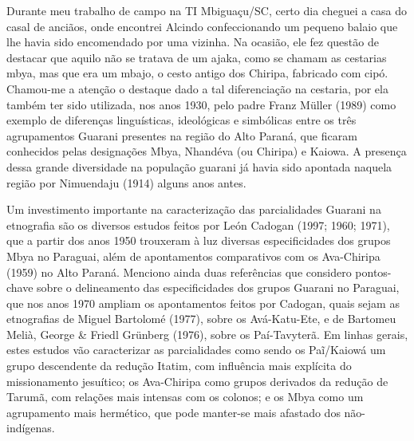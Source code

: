  


Durante meu trabalho de campo na TI Mbiguaçu/SC, certo dia cheguei a
casa do casal de anciãos, onde encontrei Alcindo confeccionando um
pequeno balaio que lhe havia sido encomendado por uma vizinha. Na
ocasião, ele fez questão de destacar que aquilo não se tratava de um
ajaka, como se chamam as cestarias mbya, mas que era um mbajo, o cesto
antigo dos Chiripa, fabricado com cipó. Chamou-me a atenção o destaque
dado a tal diferenciação na cestaria, por ela também ter sido
utilizada, nos anos 1930, pelo padre Franz Müller (1989) como exemplo
de diferenças linguísticas, ideológicas e simbólicas entre os três
agrupamentos Guarani presentes na região do Alto Paraná, que ficaram
conhecidos pelas designações Mbya, Nhandéva (ou Chiripa) e Kaiowa. A
presença dessa grande diversidade na população guarani já havia sido
apontada naquela região por Nimuendaju (1914) alguns anos antes.

Um investimento importante na caracterização das parcialidades Guarani
na etnografia são os diversos estudos feitos por León Cadogan (1997;
1960; 1971), que a partir dos anos 1950 trouxeram à luz diversas
especificidades dos grupos Mbya no Paraguai, além de apontamentos
comparativos com os Ava-Chiripa (1959) no Alto Paraná. Menciono ainda
duas referências que considero pontos-chave sobre o delineamento das
especificidades dos grupos Guarani no Paraguai, que nos anos 1970
ampliam os apontamentos feitos por Cadogan, quais sejam as etnografias
de Miguel Bartolomé (1977), sobre os Avá-Katu-Ete, e de Bartomeu Melià,
George \& Friedl Grünberg (1976), sobre os Paí-Tavyterã. Em linhas
gerais, estes estudos vão caracterizar as parcialidades como sendo os
Paĩ/Kaiowá um grupo descendente da redução
Itatim, com influência mais explícita do missionamento jesuítico; os
Ava-Chiripa como grupos derivados da redução de Tarumã, com relações
mais intensas com os colonos; e os Mbya como um agrupamento mais
hermético, que pode manter-se mais afastado dos não-indígenas. 

